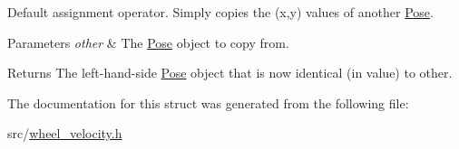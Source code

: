 Default assignment operator. Simply copies the (x,y) values of another \hyperlink{struct_pose}{Pose}. 


\begin{DoxyParams}{Parameters}
{\em other} & The \hyperlink{struct_pose}{Pose} object to copy from.\\
\hline
\end{DoxyParams}
\begin{DoxyReturn}{Returns}
The left-\/hand-\/side \hyperlink{struct_pose}{Pose} object that is now identical (in value) to {\ttfamily other}. 
\end{DoxyReturn}


The documentation for this struct was generated from the following file\+:\begin{DoxyCompactItemize}
\item 
src/\hyperlink{wheel__velocity_8h}{wheel\+\_\+velocity.\+h}\end{DoxyCompactItemize}
